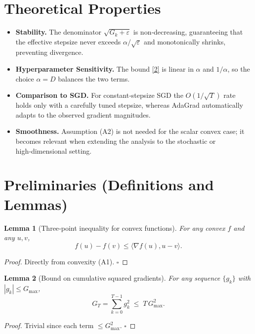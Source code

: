 \documentclass{article}
\newtheorem{lemma}{Lemma}
\begin{document}
\section*{Theoretical Properties}
\begin{itemize}
\item \textbf{Stability.} The denominator $\sqrt{G_k+\varepsilon}$ is non‑decreasing,
  guaranteeing that the effective stepsize never exceeds $\alpha/\sqrt{\varepsilon}$
  and monotonically shrinks, preventing divergence.
\item \textbf{Hyperparameter Sensitivity.} The bound \eqref{2} is linear in $\alpha$
  and $1/\alpha$, so the choice $\alpha=D$ balances the two terms.
\item \textbf{Comparison to SGD.} For constant‑stepsize SGD the $O(1/\sqrt{T})$ rate
  holds only with a carefully tuned stepsize, whereas AdaGrad automatically
  adapts to the observed gradient magnitudes.
\item \textbf{Smoothness.} Assumption (A2) is not needed for the scalar convex case;
  it becomes relevant when extending the analysis to the stochastic or
  high‑dimensional setting.
\end{itemize}

\section*{Preliminaries (Definitions and Lemmas)}
\begin{lemma}[Three‑point inequality for convex functions]\label{lem:3pt}
For any convex $f$ and any $u,v$,
\[
f(u)-f(v)\le \langle \nabla f(u),u-v\rangle .
\tag{15}
\]
\end{lemma}
\begin{proof}
Directly from convexity (A1). $\square$
\end{proof}

\begin{lemma}[Bound on cumulative squared gradients]\label{lem:sq}
For any sequence $\{g_k\}$ with $|g_k|\le G_{\max}$,
\[
G_T=\sum_{k=0}^{T-1}g_k^{2}\;\le\;T\,G_{\max}^{2}.
\tag{16}
\]
\end{lemma}
\begin{proof}
Trivial since each term $\le G_{\max}^{2}$. $\square$
\end{proof}
\end{document}
